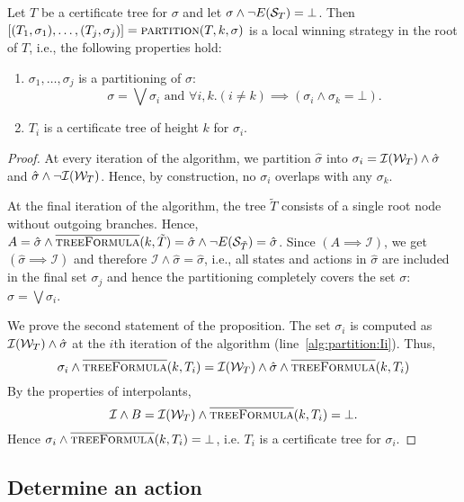\begin{proposition}\label{prop:partition}
    Let $T$ be a certificate tree for $\sigma$ and let $\sigma \land \lnot E(\mathcal{S}_T) = \bot$. Then $[(T_1, \sigma_1),\ldots,(T_j, \sigma_j)] = \textsc{partition}(T, k, \sigma)$ is a local winning strategy in the root of $T$, i.e., the following properties hold:
    \begin{enumerate}
        \item $\sigma_1 ,\ldots, \sigma_j$ is a partitioning of
            $\sigma$: $$\sigma = \bigvee \sigma_i \text{ and } \forall i, k. (i \neq k) \implies (\sigma_i \land \sigma_k = \bot).$$
        \item $T_i$ is a certificate tree of height $k$ for $\sigma_i$.
    \end{enumerate}
\end{proposition}
\begin{proof}
    At every iteration of the algorithm, we partition $\hat{\sigma}$ into $\sigma_i = \mathcal{I}(\mathcal{W}_T) \land \hat{\sigma}$ and $\hat{\sigma} \land \neg\mathcal{I}(\mathcal{W}_T)$. Hence, by construction, no $\sigma_i$ overlaps with any $\sigma_k$.

    At the final iteration of the algorithm, the tree $\tilde{T}$ consists of a single root node without outgoing branches.  Hence, $A = \hat{\sigma} \land \textsc{$\overline{\mbox{treeFormula}}$}(k, \tilde{T}) = \hat{\sigma} \land \neg E(\mathcal{S}_{\tilde{T}}) = \hat{\sigma}$.  Since $(A \implies \mathcal{I})$, we get $(\hat{\sigma} \implies \mathcal{I})$ and therefore $\mathcal{I} \land \hat{\sigma} = \hat{\sigma}$, i.e., all states and actions in $\hat{\sigma}$ are included in the final set $\sigma_j$ and hence the partitioning completely covers the set $\sigma$: $\sigma=\bigvee \sigma_i$.

    We prove the second statement of the proposition.  The set $\sigma_i$ is computed as $\mathcal{I}(\mathcal{W}_T) \land \hat{\sigma}$ at the $i$th iteration of the algorithm (line~\ref{alg:partition:Ii}).
    Thus, $$\sigma_i \land \textsc{$\overline{\mbox{treeFormula}}$}(k, T_i) = \mathcal{I}(\mathcal{W}_T) \land \hat{\sigma} \land \textsc{$\overline{\mbox{treeFormula}}$}(k, T_i)$$ By the properties of interpolants, $$\mathcal{I} \land B = \mathcal{I}(\mathcal{W}_T) \land \textsc{$\overline{\mbox{treeFormula}}$}(k, T_i) = \bot.$$  Hence $\sigma_i \land \textsc{$\overline{\mbox{treeFormula}}$}(k, T_i) = \bot$, i.e. $T_i$ is a certificate tree for $\sigma_i$.
\end{proof}

\subsection{Determine an action}


